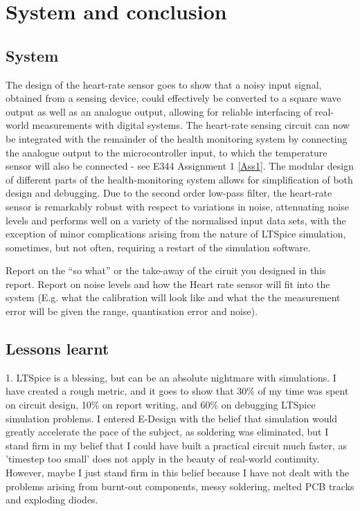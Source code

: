 \chapter{System and conclusion}
\vspace{-5mm}
\section{System}

The design of the heart-rate sensor goes to show that a noisy input signal, obtained from a sensing device, could effectively be converted to a square wave output as well as an analogue output, allowing for reliable interfacing of real-world measurements with digital systems. The heart-rate sensing circuit can now be integrated with the remainder of the health monitoring system by connecting the analogue output to the microcontroller input, to which the temperature sensor will also be connected - see E344 Assignment 1 \ref{Ass1}. The modular design of different parts of the health-monitoring system allows for simplification of both design and debugging.
Due to the second order low-pass filter, the heart-rate sensor is remarkably robust with respect to variations in noise, attenuating noise levels and performs well on a variety of the normalised input data sets, with the exception of minor complications arising from the nature of LTSpice simulation, sometimes, but not often, requiring a restart of the simulation software.


Report on the ``so what'' or the take-away of the ciruit you designed in this report.  
Report on noise levels and how the Heart rate sensor will fit into the system (E.g. what the calibration will look like and what the the measurement error will be given the range, quantisation error and noise). 

\section{Lessons learnt}
1. LTSpice is a blessing, but can be an absolute nightmare with simulations. I have created a rough metric, and it goes to show that 30\% of my time was spent on circuit design, 10\% on report writing, and 60\% on debugging LTSpice simulation problems. I entered E-Design with the belief that simulation would greatly accelerate the pace of the subject, as soldering was eliminated, but I stand firm in my belief that I could have built a practical circuit much faster, as 'timestep too small' does not apply in the beauty of real-world continuity. However, maybe I just stand firm in this belief because I have not dealt with the problems arising from burnt-out components, messy soldering, melted PCB tracks and exploding diodes.

